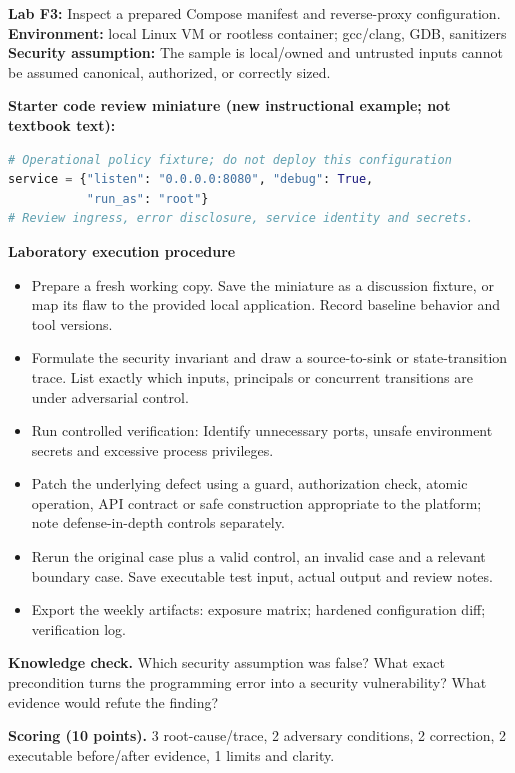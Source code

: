 \documentclass[10pt,letterpaper]{article}
\begin{document}
\begin{insight}\textbf{Lab F3:} Inspect a prepared Compose manifest and reverse-proxy configuration.\\\textbf{Environment:} local Linux VM or rootless container; gcc/clang, GDB, sanitizers\\\textbf{Security assumption:} The sample is local/owned and untrusted inputs cannot be assumed canonical, authorized, or correctly sized.\end{insight}
\textbf{Starter code review miniature (new instructional example; not textbook text):}
\begin{lstlisting}[language=Python]
# Operational policy fixture; do not deploy this configuration
service = {"listen": "0.0.0.0:8080", "debug": True,
           "run_as": "root"}
# Review ingress, error disclosure, service identity and secrets.
\end{lstlisting}
\textbf{Laboratory execution procedure}
\begin{itemize}[leftmargin=*,itemsep=2pt]
\item Prepare a fresh working copy. Save the miniature as a discussion fixture, or map its flaw to the provided local application. Record baseline behavior and tool versions.
\item Formulate the security invariant and draw a source-to-sink or state-transition trace. List exactly which inputs, principals or concurrent transitions are under adversarial control.
\item Run controlled verification: Identify unnecessary ports, unsafe environment secrets and excessive process privileges.
\item Patch the underlying defect using a guard, authorization check, atomic operation, API contract or safe construction appropriate to the platform; note defense-in-depth controls separately.
\item Rerun the original case plus a valid control, an invalid case and a relevant boundary case. Save executable test input, actual output and review notes.
\item Export the weekly artifacts: exposure matrix; hardened configuration diff; verification log.
\end{itemize}
\textbf{Knowledge check.} Which security assumption was false? What exact precondition turns the programming error into a security vulnerability? What evidence would refute the finding?

\textbf{Scoring (10 points).} 3 root-cause/trace, 2 adversary conditions, 2 correction, 2 executable before/after evidence, 1 limits and clarity.
\end{document}
